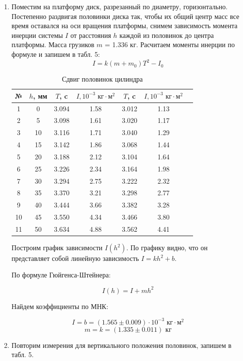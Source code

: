 \documentclass[a4paper, 10pt]{article}%
\begin{document}
\begin{enumerate}
		\item Поместим на платформу диск, разрезанный по диаметру, горизонтально. Постепенно раздвигая половинки диска так, чтобы их общий центр масс все время оставался на оси вращения платформы, снимем зависимость момента инерции системы $I$ от расстояния $h$ каждой из половинок до центра платформы. Масса грузиков $m$ = 1.336 кг. Расчитаем моменты инерции по формуле и запишем в табл. 5:
		\[I = k(m+m_0)T^2 - I_0\]
		\begin{table}[h]
			\centering
			\caption{Сдвиг половинок цилиндра}
			\begin{tabular}{|c|c||c|c||c|c|c|}
				\hline
				№ & $h$, мм & $T$, c & $I, 10^{-3} \text{ кг}\cdot\text{м}^2$ & $T$, c & $I, 10^{-3} \text{ кг}\cdot\text{м}^2$ \\
				\hline
				1  & 0  & 3.094 & 1.58 & 3.012 & 1.13 \\
				2  & 5  & 3.098 & 1.61 & 3.020 & 1.17 \\
				3  & 10 & 3.116 & 1.71 & 3.040 & 1.29 \\
				4  & 15 & 3.142 & 1.86 & 3.068 & 1.44 \\
				5  & 20 & 3.188 & 2.12 & 3.104 & 1.64 \\
				6  & 25 & 3.226 & 2.34 & 3.164 & 1.98 \\
				7  & 30 & 3.294 & 2.75 & 3.222 & 2.32 \\
				8  & 35 & 3.370 & 3.21 & 3.298 & 2.77 \\
				9  & 40 & 3.444 & 3.66 & 3.382 & 3.28 \\
				10 & 45 & 3.550 & 4.34 & 3.466 & 3.80 \\
				11 & 50 & 3.634 & 4.88 & 3.562 & 4.41 \\
				\hline
			\end{tabular}
		\end{table}
		
		Построим график зависимости $I(h^2)$. По графику видно, что он представляет собой линейную зависимость $I = kh^2 + b$.
		
		По формуле Гюйгенса-Штейнера:
		
		\[I(h) = I + mh^2\]
		
		Найдем коэффициенты по МНК:
		
		\[I = b = (1.565 \pm 0.009) \cdot 10^{-3} \text{ кг}\cdot\text{м}^2\]
		\[m = k = (1.335 \pm 0.011) \text{ кг}\]
		
		\item Повторим измерения для вертикального положения половинок, запишем в табл. 5.
		

\end{enumerate}
\end{document}
